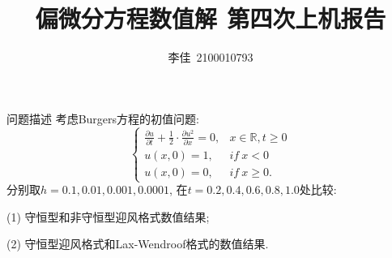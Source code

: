 \documentclass{article}
\title{偏微分方程数值解$\ \ $第四次上机报告}
\author{李佳~2100010793}
\date{}
\begin{document}
\maketitle
\begin{section}{问题描述}
    考虑Burgers方程的初值问题:
    $$\left\{\begin{array}{ll}
        \frac{\partial u}{\partial t} + \frac{1}{2}\cdot \frac{\partial u^2}{\partial x}=0, & x\in\mathbb{R},t\geq 0\\
        u(x,0) = 1, & if\ x<0\\
        u(x,0) = 0, & if\ x\geq 0.
    \end{array}\right.$$
    分别取$h=0.1,0.01,0.001,0.0001$, 在$t=0.2,0.4,0.6,0.8,1.0$处比较:

    (1) 守恒型和非守恒型迎风格式数值结果;

    (2) 守恒型迎风格式和Lax-Wendroof格式的数值结果.
\end{section}
\end{document}
